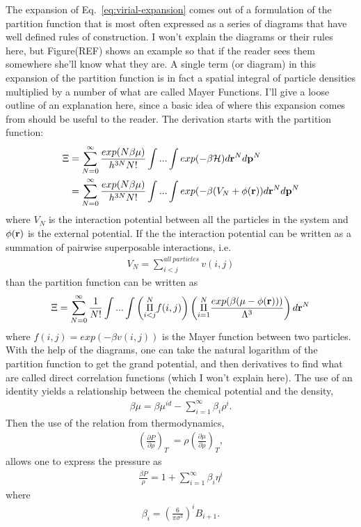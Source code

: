 The expansion of Eq.~\ref{eq:virial-expansion} comes out of a
formulation of the partition function that is most often expressed as
a series of diagrams that have well defined rules of construction.  I
won't explain the diagrams or their rules here, but Figure(REF) shows
an example so that if the reader sees them somewhere she'll know what
they are.  A single term (or diagram) in this expansion of the
partition function is in fact a spatial integral of particle densities
multiplied by a number of what are called Mayer Functions.  I'll give
a loose outline of an explanation here, since a basic idea of where
this expansion comes from should be useful to the reader.  The
derivation starts with the partition function:
\begin{align}
  \Xi &= \sum_{N=0}^{\infty}\frac{exp(N\beta\mu)}{h^{3N}N!}\int...\int exp(-\beta \mathcal{H})d\textbf{r}^Nd\mathbf{p}^N \\
  &=\sum_{N=0}^{\infty}\frac{exp(N\beta\mu)}{h^{3N}N!}\int...\int exp(-\beta (V_N + \phi(\textbf{r}))d\textbf{r}^Nd\mathbf{p}^N
\end{align}
where $V_N$ is the interaction potential between all the particles in
the system and $\phi(\textbf{r})$ is the external potential.  If the the
interaction potential can be written as a summation of pairwise
superposable interactions, i.e.
\begin{align}
  V_N = \sum_{i<j}^{all~particles} v(i,j)
\end{align}
 than the partition function can be written as
\begin{align}
  \Xi = \sum_{N=0}^{\infty}\frac{1}{N!}\int... \int \left(\overset{N}{\underset{i<j}{\Pi}} f(i,j)\right)
  \left( \overset{N}{\underset{i=1}{\Pi}} \frac{exp(\beta (\mu - \phi(\textbf{r})))}{\Lambda^3}\right)d\textbf{r}^N
\end{align}
where $f(i,j)=exp(-\beta v(i,j))$ is the Mayer function between two
particles.  With the help of the diagrams, one can take the natural
logarithm of the partition function to get the grand potential, and
then derivatives to find what are called direct correlation functions
(which I won't explain here). The use of an identity yields a
relationship between the chemical potential and the density,
\begin{align}
  \beta \mu = \beta \mu^{id} - \sum_{i=1}^{\infty}\beta_i\rho^i.
\end{align}
Then the use of the relation from thermodynamics,
\begin{align}
  \left(\frac{\partial P}{\partial \rho}\right)_T \
  = \rho \left(\frac{\partial \mu}{\partial \rho}\right)_T,
\end{align}
allows one to express the pressure as
\begin{align}
  \frac{\beta P}{\rho} = 1 + \sum_{i=1}^{\infty}\beta_i\eta^i
\end{align}
where
\begin{align}
  \label{eq:virial-coeff}
  \beta_i = (\frac{6}{\pi \sigma^3})^i B_{i+1}.
\end{align}

